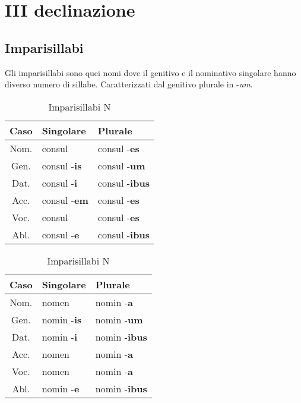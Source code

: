 \section{III declinazione}
\subsection{Imparisillabi}
Gli imparisillabi sono quei nomi dove il genitivo e il nominativo singolare hanno diverso numero di sillabe.
Caratterizzati dal genitivo plurale in -\textit{um}.
\begin{table}[h!]
    \begin{minipage}{.4\linewidth}
        \centering
        \begin{tabular}{|c|l|l|}
            \hline
            \textbf{Caso} & \textbf{Singolare} & \textbf{Plurale} \\
            \hline
            Nom. & consul              & consul -\textbf{es} \\
            \hline
            Gen. & consul -\textbf{is} & consul -\textbf{um} \\
            \hline
            Dat. & consul -\textbf{i}  & consul -\textbf{ibus} \\
            \hline
            Acc. & consul -\textbf{em} & consul -\textbf{es} \\
            \hline
            Voc. & consul              & consul -\textbf{es} \\
            \hline
            Abl. & consul -\textbf{e}  & consul -\textbf{ibus} \\
            \hline
        \end{tabular}
        \caption{Imparisillabi M \& F}
    \end{minipage}
    \hfill
    \begin{minipage}{.4\linewidth}
        \centering
        \begin{tabular}{|c|l|l|}
            \hline
            \textbf{Caso} & \textbf{Singolare} & \textbf{Plurale} \\
            \hline
            Nom. & nomen              & nomin -\textbf{a} \\
            \hline
            Gen. & nomin -\textbf{is} & nomin -\textbf{um} \\
            \hline
            Dat. & nomin -\textbf{i}  & nomin -\textbf{ibus} \\
            \hline
            Acc. & nomen              & nomin -\textbf{a} \\
            \hline
            Voc. & nomen              & nomin -\textbf{a} \\
            \hline
            Abl. & nomin -\textbf{e}  & nomin -\textbf{ibus} \\
            \hline
        \end{tabular}
        \caption{Imparisillabi N}
    \end{minipage}
\end{table}

